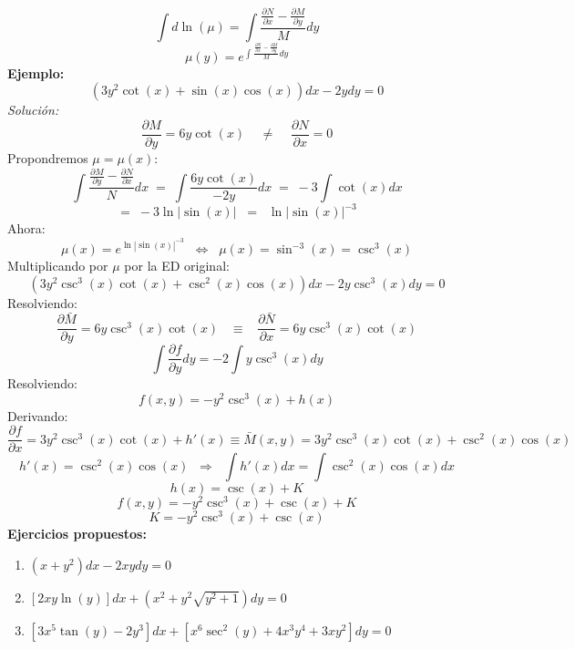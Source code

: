 \documentclass[10pt]{article}
\begin{document}
\[\int d\ln(\mu)=\int\frac{\frac{\partial{N}}{\partial{x}}-\frac{\partial{M}}{\partial{y}}}{M}dy\]
\[\mu(y)=e^{\int\frac{\frac{\partial{N}}{\partial{x}}-\frac{\partial{M}}{\partial{y}}}{M}dy}\]
\clearpage
\textbf{Ejemplo:}
\[\left(3y^{2}\cot(x)+\sin(x)\cos(x)\right)dx-2ydy=0\]
\textit{Solución:}
\[\frac{\partial{M}}{\partial{y}}=6y\cot(x)\;\;\;\;\neq\;\;\;\;\frac{\partial{N}}{\partial{x}}=0\]
Propondremos $\mu=\mu(x)$:
\[\int\frac{\frac{\partial{M}}{\partial{y}}-\frac{\partial{N}}{\partial{x}}}{N}dx\;=\;\int\frac{6y\cot(x)}{-2y}dx\;=\;-3\int\cot(x)dx\]
\[=\;-3\ln|\sin(x)|\;\;=\;\;\ln\left|\sin(x)\right|^{-3}\]
Ahora:
\[\mu(x)=e^{\ln\left|\sin(x)\right|^{-3}}\;\;\Leftrightarrow\;\;\mu(x)=\sin^{-3}(x)=\csc^{3}(x)\]
Multiplicando por $\mu$ por la ED original:
\[\left(3y^{2}\csc^{3}(x)\cot(x)+\csc^{2}(x)\cos(x)\right)dx-2y\csc^{3}(x)dy=0\]
Resolviendo:
\[\frac{\partial{\bar{M}}}{\partial{y}}=6y\csc^{3}(x)\cot(x)\;\;\;\equiv\;\;\;\frac{\partial{\bar{N}}}{\partial{x}}=6y\csc^{3}(x)\cot(x)\]
\[\int\frac{\partial{f}}{\partial{y}}dy=-2\int y\csc^{3}(x)dy\]
Resolviendo:
\[f(x,y)=-y^{2}\csc^{3}(x)+h(x)\]
Derivando:
\[\frac{\partial{f}}{\partial{x}}=3y^{2}\csc^{3}(x)\cot(x)+h'(x)\equiv\bar{M}(x,y)=3y^{2}\csc^{3}(x)\cot(x)+\csc^{2}(x)\cos(x)\]
\[h'(x)=\csc^{2}(x)\cos(x)\;\;\Rightarrow\;\;\int h'(x)dx=\int\csc^{2}(x)\cos(x)dx\]
\[h(x)=\csc(x)+K\]
\[f(x,y)=-y^{2}\csc^{3}(x)+\csc(x)+K\]
\[K=-y^{2}\csc^{3}(x)+\csc(x)\]
\textbf{Ejercicios propuestos:}
\begin{enumerate}
  \item \(\displaystyle \left(x+y^{2}\right)dx-2xydy=0\)
  \item \(\displaystyle \left[2xy\ln\left(y\right)\right]dx+\left(x^{2}+y^{2}\sqrt{y^{2}+1}\right)dy=0\)
  \item \(\displaystyle \left[3x^{5}\tan\left(y\right)-2y^{3}\right]dx+\left[x^{6}\sec^{2}\left(y\right)+4x^{3}y^{4}+3xy^{2}\right]dy=0\)
\end{enumerate}
\clearpage
\end{document}
